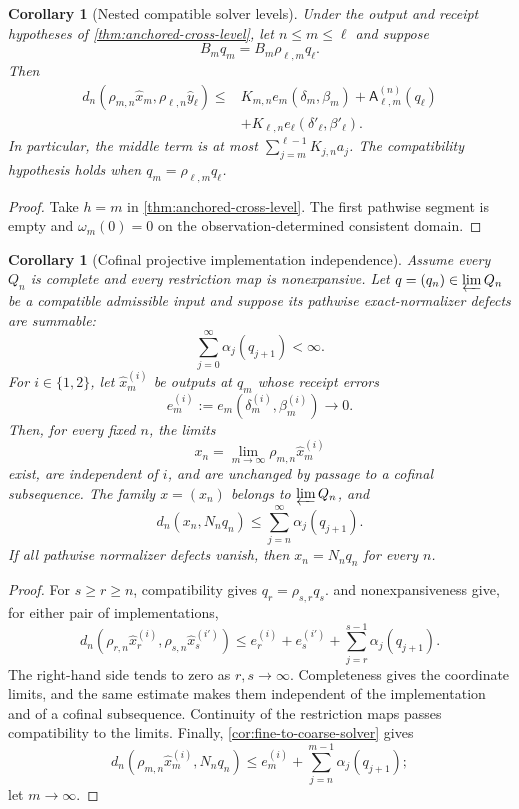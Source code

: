 \documentclass[11pt]{article}
\newtheorem{corollary}[theorem]{Corollary}
\theoremstyle{definition}
\theoremstyle{remark}
\numberwithin{equation}{section}
\begin{document}
\begin{corollary}[Nested compatible solver levels]
\label{cor:nested-cross-level}
Under the output and receipt hypotheses of
\cref{thm:anchored-cross-level}, let $n\le m\le\ell$ and suppose
\[
 B_mq_m=B_m\rho_{\ell,m}q_\ell.
\]
Then
\[
\begin{split}
 d_n\!\left(
 \rho_{m,n}\widehat x_m,
 \rho_{\ell,n}\widehat y_\ell
 \right)
 \le{}&
 K_{m,n}e_m(\delta_m,\beta_m)
 +\mathsf A_{\ell,m}^{(n)}(q_\ell)\\
 &+K_{\ell,n}e_\ell(\delta'_\ell,\beta'_\ell).
\end{split}
\]
In particular, the middle term is at most
$\sum_{j=m}^{\ell-1}K_{j,n}a_j$.  The compatibility hypothesis holds when
$q_m=\rho_{\ell,m}q_\ell$.
\end{corollary}

\begin{proof}
Take $h=m$ in \cref{thm:anchored-cross-level}.  The first pathwise segment
is empty and $\omega_m(0)=0$ on the observation-determined consistent
domain.
\end{proof}

\begin{corollary}[Cofinal projective implementation independence]
\label{cor:cofinal-projective}
Assume every $Q_n$ is complete and every restriction map is nonexpansive.
Let $q=(q_n)\in\varprojlim Q_n$ be a compatible admissible input and suppose
its pathwise exact-normalizer defects are summable:
\[
 \sum_{j=0}^{\infty}\alpha_j(q_{j+1})<\infty.
\]
For $i\in\{1,2\}$, let $\widehat x_m^{(i)}$ be outputs at $q_m$ whose
receipt errors
\[
 e_m^{(i)}
 :=
 e_m(\delta_m^{(i)},\beta_m^{(i)})
 \longrightarrow0.
\]
Then, for every fixed $n$, the limits
\[
 x_n
 =
 \lim_{m\to\infty}\rho_{m,n}\widehat x_m^{(i)}
\]
exist, are independent of $i$, and are unchanged by passage to a cofinal
subsequence.  The family $x=(x_n)$ belongs to $\varprojlim Q_n$, and
\[
 d_n(x_n,N_nq_n)
 \le
 \sum_{j=n}^{\infty}\alpha_j(q_{j+1}).
\]
If all pathwise normalizer defects vanish, then $x_n=N_nq_n$ for every $n$.
\end{corollary}

\begin{proof}
For $s\ge r\ge n$, compatibility gives $q_r=\rho_{s,r}q_s$.
 and nonexpansiveness give, for either pair of
implementations,
\[
 d_n\!\left(
 \rho_{r,n}\widehat x_r^{(i)},
 \rho_{s,n}\widehat x_s^{(i')}
 \right)
 \le
 e_r^{(i)}+e_s^{(i')}
 +\sum_{j=r}^{s-1}\alpha_j(q_{j+1}).
\]
The right-hand side tends to zero as $r,s\to\infty$.  Completeness gives
the coordinate limits, and the same estimate makes them independent of the
implementation and of a cofinal subsequence.  Continuity of the restriction
maps passes compatibility to the limits.  Finally,
\cref{cor:fine-to-coarse-solver} gives
\[
 d_n\!\left(
 \rho_{m,n}\widehat x_m^{(i)},N_nq_n
 \right)
 \le
 e_m^{(i)}
 +\sum_{j=n}^{m-1}\alpha_j(q_{j+1});
\]
let $m\to\infty$.
\end{proof}
\end{document}
